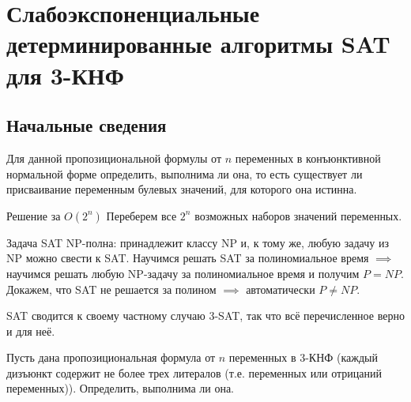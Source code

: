 \hypertarget{3sat}{}
\section{Слабоэкспоненциальные детерминированные алгоритмы SAT для 3-КНФ}
\subsection{Начальные сведения}

\secauthor{\denis}
\begin{problem*}[SAT]
Для данной пропозициональной формулы от $n$ переменных в конъюнктивной нормальной форме определить, выполнима ли она, то есть существует ли присваивание переменным булевых значений, для которого она истинна.
\end{problem*}

\begin{algodescription}{Решение за $O(2^n)$}
    Переберем все $2^n$ возможных наборов значений переменных.
\end{algodescription}

\begin{nb*}
    Задача SAT NP-полна: принадлежит классу NP и, к тому же, любую задачу из NP можно свести к SAT. Научимся решать SAT за полиномиальное время $\implies$ научимся решать любую NP-задачу за полиномиальное время и получим $P=NP$. Докажем, что SAT не решается за полином $\implies$ автоматически $P\neq NP$.
\end{nb*}

\begin{nb*}
	SAT сводится к своему частному случаю 3-SAT, так что всё перечисленное верно и для неё.
\end{nb*}

\begin{problem*}[3-SAT]
	Пусть дана пропозициональная формула от $n$ переменных в 3-КНФ (каждый дизъюнкт содержит не более трех литералов (т.е. переменных или отрицаний переменных)). Определить, выполнима ли она.
\end{problem*}

